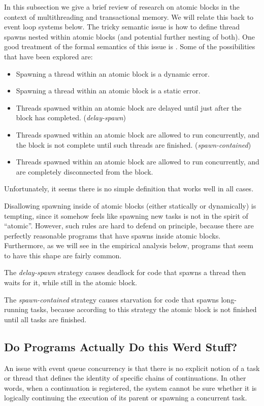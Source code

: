 \documentclass[acmsmall,anonymous,review]{acmart}\settopmatter{printfolios=true,printccs=false,printacmref=false}
\begin{document}
In this subsection we give a brief review of research on atomic blocks in the context of multithreading and transactional memory.
We will relate this back to event loop systems below.
The tricky semantic issue is how to define thread spawns nested within atomic blocks (and potential further nesting of both).
One good treatment of the formal semantics of this issue is \cite{Moore2008}.
Some of the possibilities that have been explored are:
\begin{itemize}
\item Spawning a thread within an atomic block is a dynamic error.
\item Spawning a thread within an atomic block is a static error.
\item Threads spawned within an atomic block are delayed until just after the block has completed. (\emph{delay-spawn})
\item Threads spawned within an atomic block are allowed to run concurrently, and the block is not complete until such threads are finished. (\emph{spawn-contained})
\item Threads spawned within an atomic block are allowed to run concurrently, and are completely disconnected from the block.
\end{itemize}

Unfortunately, it seems there is no simple definition that works well in all cases.

Disallowing spawning inside of atomic blocks (either statically or dynamically) is tempting, since it somehow feels like spawning new tasks is not in the spirit of ``atomic''.
However, such rules are hard to defend on principle, because there are perfectly reasonable programs that have spawns inside atomic blocks.
Furthermore, as we will see in the empirical analysis below, programs that seem to have this shape are fairly common.

The \emph{delay-spawn} strategy causes deadlock for code that spawns a thread then waits for it, while still in the atomic block.

The \emph{spawn-contained} strategy causes starvation for code that spawns long-running tasks, because according to this strategy the atomic block is not finished until all tasks are finished.

\subsection{Do Programs Actually Do this Werd Stuff?}

An issue with event queue concurrency is that there is no explicit notion of a task or thread that defines the identity of specific chains of continuations.
In other words, when a continuation is registered, the system cannot be sure whether it is logically continuing the execution of its parent or spawning a concurrent task.
\end{document}
